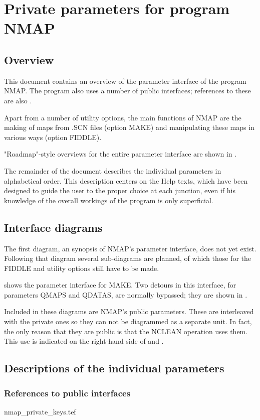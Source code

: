 
\chapter{ Private parameters for program NMAP}
\tableofcontents


\section{ Overview}
\label{.overview}

	This document contains an overview of the parameter interface of the
program NMAP. The program also uses a number of public interfaces; references
to these are also .


	Apart from a number of utility options, the main functions of NMAP are
the making of maps from .SCN files (option MAKE) and manipulating these maps in
various ways (option FIDDLE).

	"Roadmap"-style overviews for the entire parameter interface are shown
in .

	The remainder of the document describes the individual parameters in
alphabetical order. This description centers on the Help texts, which have been
designed to guide the user to the proper choice at each junction, even if his
knowledge of the overall workings of the program is only superficial.



\section{ Interface diagrams}
\label{.diagrams}

	The first diagram, an synopsis of NMAP's parameter interface, does not
yet exist. Following that diagram several sub-diagrams are planned, of which
those for the FIDDLE and utility options still have to be made.

	 shows the parameter interface for MAKE. Two detours
in this interface, for parameters QMAPS and QDATAS, are normally bypassed; they
are shown in .

	Included in these diagrams are NMAP's public parameters. These are
interleaved with the private ones so they can not be diagrammed as a separate
unit. In fact, the only reason that they are public is that the NCLEAN
 operation uses them. This use
is indicated on the right-hand side of  and
.





\section{ Descriptions of the individual parameters}
\label{.descriptions}

\subsection{ References to public interfaces}
\label{.public}

 {nmap_private_keys.tef}
